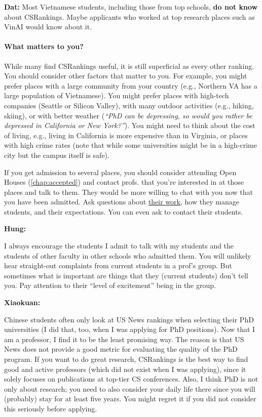 \documentclass[oneside,11pt,dvipsnames]{book}
\newenvironment{commentbox}[1][]{
  \small
  \begin{mybox}
    {\small \textbf{#1}}
  }{
  \end{mybox}
}
\begin{document}
\begin{commentbox}[Dat:] Most Vietnamese students, including those from top schools, \textbf{do not know} about CSRankings.  Maybe applicants who worked at top research places such as VinAI would know about it.
\end{commentbox}

\paragraph{What matters to you?} While many find CSRankings useful, it is still superficial as every other ranking.  You should consider other factors that matter to you.  For example, you might prefer places with a large community from your country (e.g., Northern VA has a large population of Vietnamese). You might prefer places with high-tech companies (Seattle or Silicon Valley), with many outdoor activities (e.g., hiking, skiing), or with better weather (\emph{``PhD can be depressing, so would you rather be depressed in California or New York?''}).  You might need to think about the cost of living, e.g., living in California is more expensive than in Virginia, or places with high crime rates (note that while some universities might be in a high-crime city but the campus itself is safe).

If you get admission to several places, you should consider attending Open Houses (\autoref{chap:accepted}) and contact profs. that you're interested in at those places and talk to them.  They would be more willing to chat with you now that you have been admitted.  Ask questions about \href{https://github.com/dynaroars/dynaroars.github.io/wiki/Answers-to-Ph.D-Advisor-Guide}{their work}, how they manage students, and their expectations. You can even ask to contact their students.

\begin{commentbox}[Hung:]
  I always encourage the students I admit to talk with my students and the students of other faculty in other schools who admitted them. You will unlikely hear straight-out complaints from current students in a prof's group. But sometimes what is important are things that they (current students) don't tell you. Pay attention to their ``level of excitement'' being in the group.
\end{commentbox}

\begin{commentbox}[Xiaokuan:]
  Chinese students often only look at US News rankings when selecting their PhD universities (I did that, too, when I was applying for PhD positions).
  Now that I am a professor, I find it to be the least promising way.
  The reason is that US News does not provide a good metric for evaluating the quality of the PhD program.
  If you want to do great research, CSRankings is the best way to find good and active professors (which did not exist when I was applying),
  since it solely focuses on publications at top-tier CS conferences.
  Also,
  I think PhD is not only about research;
  you need to also consider your daily life there since you will (probably) stay for at least five years.
  You might regret it if you did not consider this seriously before applying.
\end{commentbox}
\end{document}
